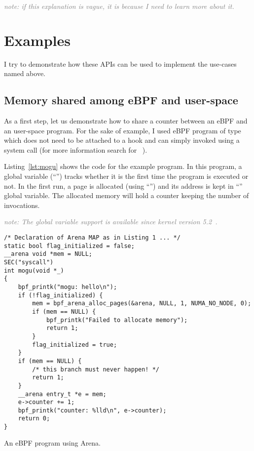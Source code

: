 \documentclass{article}
\begin{document}
\textcolor{gray}{\emph{note: if this explanation is vague, it is because I need
to learn more about it.}}


\section{Examples}

I try to demonstrate how these APIs can be used to implement the use-cases
named above.

\subsection{Memory shared among eBPF and user-space}

As a first step, let us demonstrate how to share a counter between an eBPF
and an user-space program. For the sake of example, I used eBPF program of type
~\cite{ebpf_docs_prog_syscall} which does not need to
be attached to a hook and can simply invoked using a system call (for more
information search for ~\cite{ebpf_docs_bpf_prog_run}).

Listing~\ref{lst:mogu} shows the code for the example program. In this
program, a global variable (``'') tracks whether it is the first
time the program is executed or not. In the first run, a page is allocated
(using ``'') and its address is kept in
``'' global variable. The allocated memory will hold a counter keeping
the number of invocations.

\textcolor{gray}{\textit{note: The global variable support is available since
kernel version 5.2~\cite{glb_var_post}.}}

\begin{listing}
\begin{verbatim}
/* Declaration of Arena MAP as in Listing 1 ... */
static bool flag_initialized = false;
__arena void *mem = NULL;
SEC("syscall")
int mogu(void *_)
{
    bpf_printk("mogu: hello\n");
    if (!flag_initialized) {
        mem = bpf_arena_alloc_pages(&arena, NULL, 1, NUMA_NO_NODE, 0);
        if (mem == NULL) {
            bpf_printk("Failed to allocate memory");
            return 1;
        }
        flag_initialized = true;
    }
    if (mem == NULL) {
        /* this branch must never happen! */
        return 1;
    }
    __arena entry_t *e = mem;
    e->counter += 1;
    bpf_printk("counter: %lld\n", e->counter);
    return 0;
}
\end{verbatim}
\caption{An eBPF program using Arena.}
\label{lst:mogu}
\end{listing}
\end{document}
